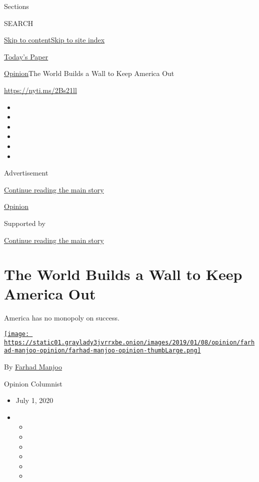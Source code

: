 Sections

SEARCH

\protect\hyperlink{site-content}{Skip to
content}\protect\hyperlink{site-index}{Skip to site index}

\href{https://myaccount.nytimes3xbfgragh.onion/auth/login?response_type=cookie\&client_id=vi}{}

\href{https://www.nytimes3xbfgragh.onion/section/todayspaper}{Today's
Paper}

\href{/section/opinion}{Opinion}\textbar{}The World Builds a Wall to
Keep America Out

\url{https://nyti.ms/2Bs21ll}

\begin{itemize}
\item
\item
\item
\item
\item
\item
\end{itemize}

Advertisement

\protect\hyperlink{after-top}{Continue reading the main story}

\href{/section/opinion}{Opinion}

Supported by

\protect\hyperlink{after-sponsor}{Continue reading the main story}

\hypertarget{the-world-builds-a-wall-to-keep-america-out}{%
\section{The World Builds a Wall to Keep America
Out}\label{the-world-builds-a-wall-to-keep-america-out}}

America has no monopoly on success.

\href{https://www.nytimes3xbfgragh.onion/by/farhad-manjoo}{\texttt{[image: https://static01.graylady3jvrrxbe.onion/images/2019/01/08/opinion/farhad-manjoo-opinion/farhad-manjoo-opinion-thumbLarge.png]}}

By \href{https://www.nytimes3xbfgragh.onion/by/farhad-manjoo}{Farhad
Manjoo}

Opinion Columnist

\begin{itemize}
\item
  July 1, 2020
\item
  \begin{itemize}
  \item
  \item
  \item
  \item
  \item
  \item
  \end{itemize}
\end{itemize}

